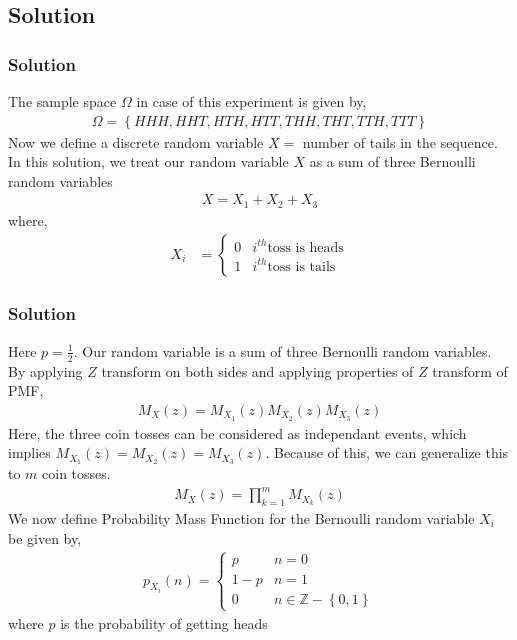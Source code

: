 \documentclass{beamer}
\providecommand{\brak}[1]{\ensuremath{\left(#1\right)}}
\providecommand{\cbrak}[1]{\ensuremath{\left\{#1\right\}}}
\theoremstyle{remark}
\numberwithin{equation}{section}
\begin{document}
    \subsection{Solution}
    \begin{frame}
      \frametitle{Solution}
      The sample space $\Omega$ in case of this experiment is given by,
      \begin{align}
        \Omega = \cbrak{HHH, HHT, HTH, HTT, THH, THT, TTH, TTT}
      \end{align} 
      Now we define a discrete random variable $X =$ number of tails in the sequence. In this solution, we treat our random variable $X$ as a sum of three Bernoulli random variables
      \begin{align}
        X = X_1 + X_2 + X_3
      \end{align}
      where,
      \begin{align}
        X_i &= \begin{cases}
          0 & i^{th}\text{toss is heads}\\
          1 & i^{th}\text{toss is tails}
        \end{cases}
      \end{align}    \end{frame}
      \begin{frame}
        \frametitle{Solution}
        Here $p = \frac{1}{2}$. Our random variable is a sum of three Bernoulli random variables. By applying $Z$ transform on both sides and applying properties of $Z$ transform of PMF,
        {\small
        \begin{align}
          M_X\brak{z} = M_{X_1}\brak{z} M_{X_2}\brak{z}M_{X_3}\brak{z} 
        \end{align}
        }
        Here, the three coin tosses can be considered as independant events, which implies  $ M_{X_1}\brak{z} = M_{X_2}\brak{z} = M_{X_3}\brak{z}$. Because of this, we can generalize this to $m$ coin tosses.
        {\small
        \begin{align}
          M_X\brak{z} = \prod_{k=1}^{m} M_{X_k}\brak{z}
        \end{align}
        }
        We now define Probability Mass Function for the Bernoulli random variable $X_i$ be given by,
        {\small
        \begin{align}
          p_{X_i}\brak{n} = \begin{cases}
            p & n = 0\\
            1-p & n = 1\\
            0 &  n \in \mathbb{Z} - \cbrak{0,1}
          \end{cases}
        \end{align}
        }
        where $p$ is the probability of getting heads  
      \end{frame}
\end{document}
